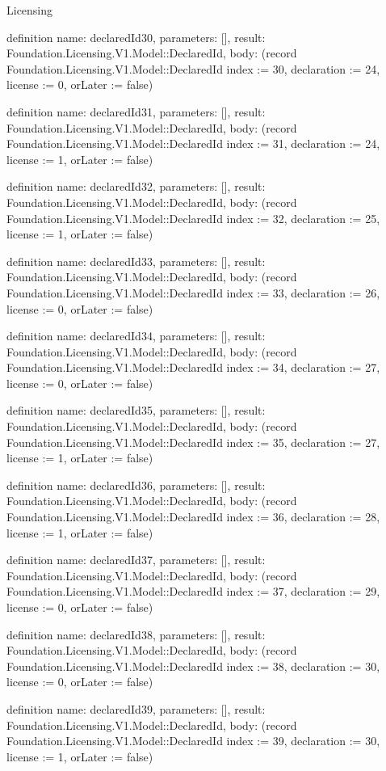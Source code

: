 \begin{lexlean}{Licensing}
\begin{semanticmodule}
definition{
  name: declaredId30,
  parameters: [],
  result: Foundation.Licensing.V1.Model::DeclaredId,
  body: (record Foundation.Licensing.V1.Model::DeclaredId {index := 30, declaration := 24, license := 0, orLater := false})
}

definition{
  name: declaredId31,
  parameters: [],
  result: Foundation.Licensing.V1.Model::DeclaredId,
  body: (record Foundation.Licensing.V1.Model::DeclaredId {index := 31, declaration := 24, license := 1, orLater := false})
}

definition{
  name: declaredId32,
  parameters: [],
  result: Foundation.Licensing.V1.Model::DeclaredId,
  body: (record Foundation.Licensing.V1.Model::DeclaredId {index := 32, declaration := 25, license := 1, orLater := false})
}

definition{
  name: declaredId33,
  parameters: [],
  result: Foundation.Licensing.V1.Model::DeclaredId,
  body: (record Foundation.Licensing.V1.Model::DeclaredId {index := 33, declaration := 26, license := 0, orLater := false})
}

definition{
  name: declaredId34,
  parameters: [],
  result: Foundation.Licensing.V1.Model::DeclaredId,
  body: (record Foundation.Licensing.V1.Model::DeclaredId {index := 34, declaration := 27, license := 0, orLater := false})
}

definition{
  name: declaredId35,
  parameters: [],
  result: Foundation.Licensing.V1.Model::DeclaredId,
  body: (record Foundation.Licensing.V1.Model::DeclaredId {index := 35, declaration := 27, license := 1, orLater := false})
}

definition{
  name: declaredId36,
  parameters: [],
  result: Foundation.Licensing.V1.Model::DeclaredId,
  body: (record Foundation.Licensing.V1.Model::DeclaredId {index := 36, declaration := 28, license := 1, orLater := false})
}

definition{
  name: declaredId37,
  parameters: [],
  result: Foundation.Licensing.V1.Model::DeclaredId,
  body: (record Foundation.Licensing.V1.Model::DeclaredId {index := 37, declaration := 29, license := 0, orLater := false})
}

definition{
  name: declaredId38,
  parameters: [],
  result: Foundation.Licensing.V1.Model::DeclaredId,
  body: (record Foundation.Licensing.V1.Model::DeclaredId {index := 38, declaration := 30, license := 0, orLater := false})
}

definition{
  name: declaredId39,
  parameters: [],
  result: Foundation.Licensing.V1.Model::DeclaredId,
  body: (record Foundation.Licensing.V1.Model::DeclaredId {index := 39, declaration := 30, license := 1, orLater := false})
}


\end{semanticmodule}
\end{lexlean}
